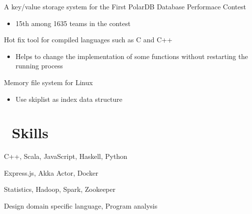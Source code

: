 \documentclass{resume}
\begin{document}
A key/value storage system for the First PolarDB Database Performace Contest
\begin{itemize}
	\item 15th among 1635 teams in the contest
\end{itemize}

Hot fix tool for compiled languages such as C and C++
\begin{itemize}
  \item Helps to change the implementation of some functions without restarting the running process
\end{itemize}


Memory file system for Linux
\begin{itemize}
	\item Use skiplist as index data structure
\end{itemize}

\section{\faCogs\ Skills}	
   C++, Scala, JavaScript, Haskell, Python

   Express.js, Akka Actor, Docker
   
	Statistics, Hadoop, Spark, Zookeeper
  
	Design domain specific language, Program analysis
\end{document}
